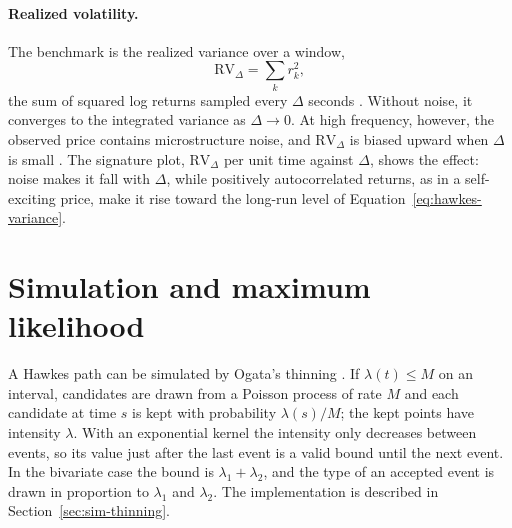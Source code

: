 \paragraph{Realized volatility.} The benchmark is the realized variance over a window,
\[
 \mathrm{RV}_\Delta=\sum_k r_k^2,
\]
the sum of squared log returns sampled every \(\Delta\) seconds
\citep{andersen2003,barndorff2002}. Without noise, it converges to the integrated variance as
\(\Delta\to0\). At high frequency, however, the observed price contains microstructure noise,
and \(\mathrm{RV}_\Delta\) is biased upward when \(\Delta\) is small \citep{zhang2005}. The
signature plot, \(\mathrm{RV}_\Delta\) per unit time against \(\Delta\), shows the effect:
noise makes it fall with \(\Delta\), while positively autocorrelated returns, as in a
self-exciting price, make it rise toward the long-run level of
Equation~\eqref{eq:hawkes-variance}.

\section{Simulation and maximum likelihood}
\label{sec:mle-theory}

A Hawkes path can be simulated by Ogata's thinning \citep{ogata1981}. If
\(\lambda(t)\le M\) on an interval, candidates are drawn from a Poisson process of rate
\(M\) and each candidate at time \(s\) is kept with probability \(\lambda(s)/M\); the kept
points have intensity \(\lambda\). With an exponential kernel the intensity only decreases
between events, so its value just after the last event is a valid bound until the next
event. In the bivariate case the bound is \(\lambda_1+\lambda_2\), and the type of an
accepted event is drawn in proportion to \(\lambda_1\) and \(\lambda_2\). The
implementation is described in Section~\ref{sec:sim-thinning}.


